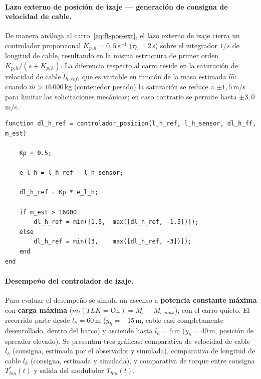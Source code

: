 \documentclass[12pt, a4paper]{article}
\begin{document}
\paragraph{Lazo externo de posición de izaje — generación de consigna de velocidad de cable.}\leavevmode

De manera análoga al carro~\eqref{eq:ft-pos-ext}, el lazo externo de izaje cierra un
controlador proporcional $K_{p,h} = 0{,}5\,\text{s}^{-1}$ ($\tau_h = 2$\,s) sobre el
integrador $1/s$ de longitud de cable, resultando en la misma estructura de primer orden
$K_{p,h}/(s+K_{p,h})$. La diferencia respecto al carro reside en la saturación de
velocidad de cable $\dot{l}_{h,ref}$, que es variable en función de la masa estimada
$\hat{m}$: cuando $\hat{m} > 16\,000$\,kg (contenedor pesado) la saturación se reduce
a $\pm 1{,}5$\,m/s para limitar las solicitaciones mecánicas; en caso contrario se
permite hasta $\pm 3{,}0$\,m/s.

\begin{lstlisting}[style=matlab, caption={Lazo externo de posición de izaje: generación de consigna de velocidad de cable.}, label=lst:ctrl-pos-hoist]
function dl_h_ref = controlador_posicion(l_h_ref, l_h_sensor, dl_h_ff, m_est)

    Kp = 0.5;

    e_l_h = l_h_ref - l_h_sensor;

    dl_h_ref = Kp * e_l_h;

    if m_est > 16000
        dl_h_ref = min([1.5,  max([dl_h_ref, -1.5])]);
    else
        dl_h_ref = min([3,    max([dl_h_ref, -3])]);
    end
end
\end{lstlisting}

\paragraph{Desempeño del controlador de izaje.}

Para evaluar el desempeño se simula un ascenso a \textbf{potencia constante máxima}
con \textbf{carga máxima} ($m_l(TLK=\text{On}) = M_s + M_{c,max}$), con el carro
quieto. El recorrido parte desde $l_h = 60$\,m ($y_h = -15$\,m, cable casi completamente
desenrollado, dentro del barco) y asciende hasta $l_h = 5$\,m ($y_h = 40$\,m, posición
de spreader elevado). Se presentan tres gráficas: comparativa de velocidad de cable
$\dot{l}_h$ (consigna, estimada por el observador y simulada), comparativa de longitud de
cable $l_h$ (consigna, estimada y simulada), y comparativa de torque entre consigna
$T_{hm}^*(t)$ y salida del modulador $T_{hm}(t)$.
\end{document}
